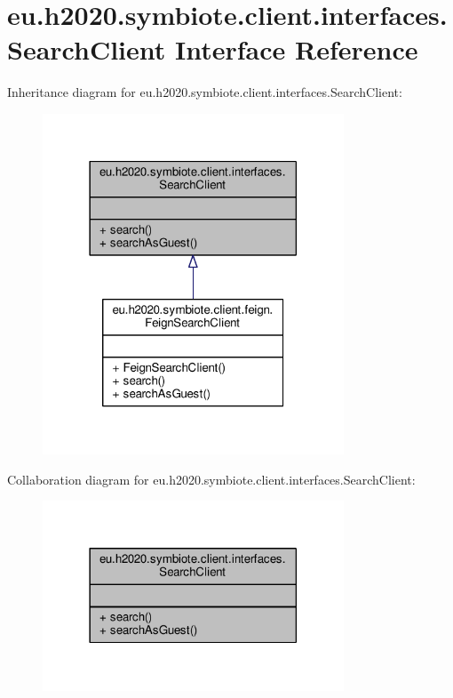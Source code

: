 \hypertarget{interfaceeu_1_1h2020_1_1symbiote_1_1client_1_1interfaces_1_1SearchClient}{}\section{eu.\+h2020.\+symbiote.\+client.\+interfaces.\+Search\+Client Interface Reference}
\label{interfaceeu_1_1h2020_1_1symbiote_1_1client_1_1interfaces_1_1SearchClient}


Inheritance diagram for eu.\+h2020.\+symbiote.\+client.\+interfaces.\+Search\+Client\+:\nopagebreak
\begin{figure}[H]
\begin{center}
\leavevmode
\includegraphics[width=254pt]{interfaceeu_1_1h2020_1_1symbiote_1_1client_1_1interfaces_1_1SearchClient__inherit__graph}
\end{center}
\end{figure}


Collaboration diagram for eu.\+h2020.\+symbiote.\+client.\+interfaces.\+Search\+Client\+:\nopagebreak
\begin{figure}[H]
\begin{center}
\leavevmode
\includegraphics[width=254pt]{interfaceeu_1_1h2020_1_1symbiote_1_1client_1_1interfaces_1_1SearchClient__coll__graph}
\end{center}
\end{figure}
